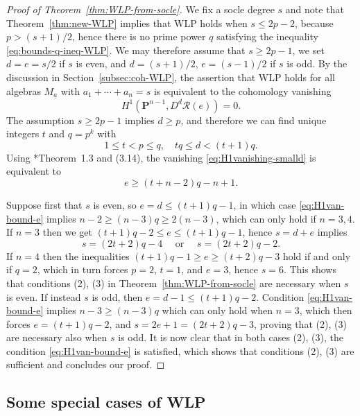 \documentclass[11pt,reqno]{amsart}
\newcommand{\mc}[1]{\mathcal{#1}}
\newcommand{\ul}[1]{\underline{#1}}
\def\PP{{\mathbf P}}
\theoremstyle{definition}
\theoremstyle{remark}
\numberwithin{equation}{section}
\begin{document}
\begin{proof}[Proof of Theorem~\ref{thm:WLP-from-socle}]
 We fix a socle degree $s$ and note that Theorem~\ref{thm:new-WLP} implies that WLP holds when $s\leq 2p-2$, because $p>(s+1)/2$, hence there is no prime power $q$ satisfying the inequality \eqref{eq:bounds-q-ineq-WLP}. We may therefore assume that $s\geq 2p-1$, we set $d=e=s/2$ if $s$ is even, and $d=(s+1)/2$, $e=(s-1)/2$ if $s$ is odd. By the discussion in Section~\ref{subsec:coh-WLP}, the assertion that WLP holds for all algebras $M_{\ul{a}}$ with $a_1+\cdots+a_n=s$ is equivalent to the cohomology vanishing
 \begin{equation}\label{eq:H1vanishing-smalld} H^1\left(\PP^{n-1},D^d\mc{R}(e)\right) = 0.\end{equation}
 The assumption $s\geq 2p-1$ implies $d\geq p$, and therefore we can find unique integers $t$ and $q=p^k$ with
 \[ 1\leq t< p\leq q,\quad tq\leq d < (t+1)q.\]
 Using \cite{gao-raicu}*{Theorem~1.3 and (3.14)}, the vanishing \eqref{eq:H1vanishing-smalld} is equivalent to
 \begin{equation}\label{eq:H1van-bound-e} e \geq (t+n-2)q-n+1.\end{equation}
 
 Suppose first that $s$ is even, so $e=d\leq(t+1)q-1$, in which case \eqref{eq:H1van-bound-e} implies $n-2\geq(n-3)q\geq 2(n-3)$, which can only hold if $n=3,4$. If $n=3$ then we get $(t+1)q-2\leq e\leq (t+1)q-1$, hence $s=d+e$ implies
 \[ s = (2t+2)q-4 \quad \text{ or }\quad s = (2t+2)q-2.\]
 If $n=4$ then the inequalities $(t+1)q-1\geq e\geq (t+2)q-3$ hold if and only if $q=2$, which in turn forces $p=2$, $t=1$, and $e=3$, hence $s=6$. This shows that conditions (2), (3) in Theorem~\ref{thm:WLP-from-socle} are necessary when $s$ is even. If instead $s$ is odd, then $e=d-1\leq(t+1)q-2$. Condition \eqref{eq:H1van-bound-e} implies $n-3\geq (n-3)q$ which can only hold when $n=3$, which then forces $e=(t+1)q-2$, and $s=2e+1=(2t+2)q-3$, proving that (2), (3) are necessary also when $s$ is odd. It is now clear that in both cases (2), (3), the condition \eqref{eq:H1van-bound-e} is satisfied, which shows that conditions (2), (3) are sufficient and concludes our proof.
\end{proof}

\subsection{Some special cases of WLP}
\label{subsec:elementary-WLP}
\end{document}
